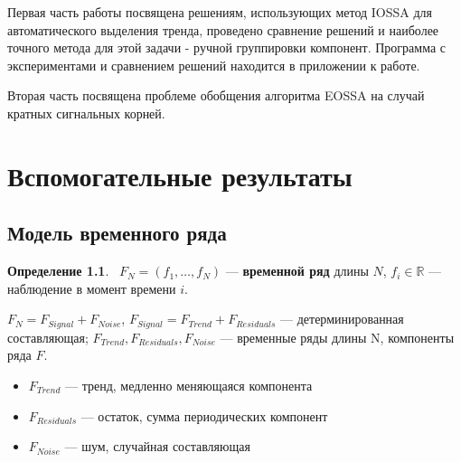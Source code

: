 \documentclass[specialist,
               substylefile = spbu_report.rtx,
               subf,href,colorlinks=true, 12pt]{disser}
\theoremstyle{definition}
\newtheorem{definition}{Определение}
\begin{document}
Первая часть работы посвящена решениям, использующих метод IOSSA для автоматического выделения тренда, проведено сравнение решений и наиболее точного метода для этой задачи - ручной группировки компонент. Программа с экспериментами и сравнением решений находится в приложении к работе.

Вторая часть посвящена проблеме обобщения алгоритма EOSSA на случай кратных сигнальных корней.

\chapter{Вспомогательные результаты}
\section{Модель временного ряда}
\begin{definition}
    ~$F_N = (f_1, \ldots, f_N)$ --- \textbf{временной ряд} длины $N$, $f_i \in \mathbb{R}$ --- наблюдение в момент времени $i$.
    
    $F_N = F_{Signal} + F_{Noise}$, $F_{Signal} = F_{Trend} + F_{Residuals}$ --- детерминированная составляющая; $F_{Trend}, F_{Residuals}, F_{Noise}$ --- временные ряды длины N, компоненты ряда $F$.
    \begin{itemize}
        \item $F_{Trend}$ --- тренд, медленно меняющаяся компонента
        \item $F_{Residuals}$ --- остаток, сумма периодических компонент
        \item $F_{Noise}$ --- шум, случайная составляющая
    \end{itemize}
\end{definition}
\end{document}
